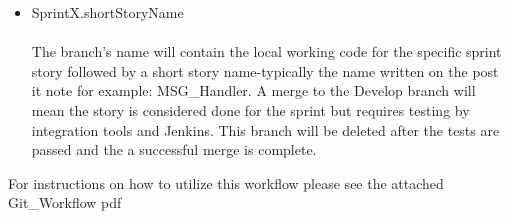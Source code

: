 \begin{itemize}
\item SprintX.shortStoryName\\ \\
The branch's name will contain the local working code for the specific sprint story followed by a short story name-typically the name written on the post it note for example: MSG\_Handler. A merge to the Develop branch will mean the story is considered done for the sprint but requires testing by integration tools and Jenkins. This branch will be deleted after the tests are passed and the a successful merge is complete.
\end{itemize}

For instructions on how to utilize this workflow please see the attached Git\_Workflow pdf
